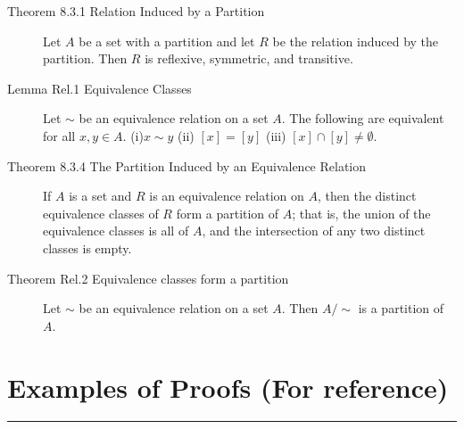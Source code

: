 \documentclass{article}
\begin{document}
\begin{description}
	 \item[Theorem 8.3.1 Relation Induced by a Partition]Let $A$ be a set with a partition and let $R$ be the relation induced by the partition. Then $R$ is reflexive, symmetric, and transitive.
	 \item[Lemma Rel.1 Equivalence Classes]Let $\sim$ be an equivalence relation on a set $A$. The following are equivalent for all $x, y\in A$. (i)$x\sim y$ \qquad (ii) $[x]=[y]$ \qquad (iii) $[x]\cap[y]\neq \emptyset$.
	 \item[Theorem 8.3.4 The Partition Induced by an Equivalence Relation] If $A$ is a set and $R$ is an equivalence relation on $A$, then the distinct equivalence classes of $R$ form a partition of $A$; that is, the union of the equivalence classes is all of $A$, and the intersection of any two distinct classes is empty.
	 \item[Theorem Rel.2 Equivalence classes form a partition]Let $\sim$ be an equivalence relation on a set $A$. Then $A/{\sim}$ is a partition of $A$.

\end{description}

	 
\newpage
\begingroup

\renewcommand{\labelenumii}{\arabic{enumi}.\arabic{enumii}}
\renewcommand{\labelenumiii}{\arabic{enumi}.\arabic{enumii}.\arabic{enumiii}}
\renewcommand{\labelenumiv}{\arabic{enumi}.\arabic{enumii}.\arabic{enumiii}.\arabic{enumiv}}

\section*{Examples of Proofs (For reference)}
\hrule
\vspace{0.5cm}
\end{document}
